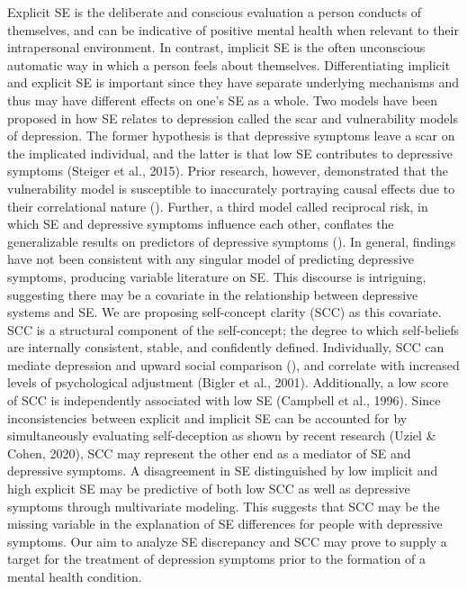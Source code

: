 \documentclass[
  man,
  longtable,
  nolmodern,
  notxfonts,
  notimes,
  colorlinks=true,linkcolor=blue,citecolor=blue,urlcolor=blue]{apa7}
\begin{document}
Explicit SE is the deliberate and conscious evaluation a person conducts
of themselves, and can be indicative of positive mental health when
relevant to their intrapersonal environment. In contrast, implicit SE is
the often unconscious automatic way in which a person feels about
themselves. Differentiating implicit and explicit SE is important since
they have separate underlying mechanisms and thus may have different
effects on one's SE as a whole. Two models have been proposed in how SE
relates to depression called the scar and vulnerability models of
depression. The former hypothesis is that depressive symptoms leave a
scar on the implicated individual, and the latter is that low SE
contributes to depressive symptoms (Steiger et al., 2015). Prior
research, however, demonstrated that the vulnerability model is
susceptible to inaccurately portraying causal effects due to their
correlational nature (). Further, a third model called reciprocal risk, in which SE and
depressive symptoms influence each other, conflates the generalizable
results on predictors of depressive symptoms
(). In
general, findings have not been consistent with any singular model of
predicting depressive symptoms, producing variable literature on SE.
This discourse is intriguing, suggesting there may be a covariate in the
relationship between depressive systems and SE. We are proposing
self-concept clarity (SCC) as this covariate. SCC is a structural
component of the self-concept; the degree to which self-beliefs are
internally consistent, stable, and confidently defined. Individually,
SCC can mediate depression and upward social comparison
(), and
correlate with increased levels of psychological adjustment (Bigler et
al., 2001). Additionally, a low score of SCC is independently associated
with low SE (Campbell et al., 1996). Since inconsistencies between
explicit and implicit SE can be accounted for by simultaneously
evaluating self-deception as shown by recent research (Uziel \& Cohen,
2020), SCC may represent the other end as a mediator of SE and
depressive symptoms. A disagreement in SE distinguished by low implicit
and high explicit SE may be predictive of both low SCC as well as
depressive symptoms through multivariate modeling. This suggests that
SCC may be the missing variable in the explanation of SE differences for
people with depressive symptoms. Our aim to analyze SE discrepancy and
SCC may prove to supply a target for the treatment of depression
symptoms prior to the formation of a mental health condition.
\end{document}
